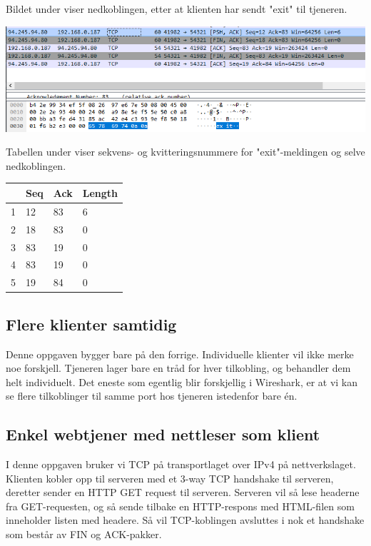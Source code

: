 \documentclass[12pt]{article}
\begin{document}
    Bildet under viser nedkoblingen, etter at klienten har sendt "exit" til tjeneren.

    \begin{center}
        \includegraphics[width=\linewidth]{assets/pYiH4NJ.png}
    \end{center}

    Tabellen under viser sekvens- og kvitteringsnummere for "exit"-meldingen og selve nedkoblingen.

    \begin{center}
        \begin{tabular}{|l|l|l|l|}
            \hline
              & Seq & Ack & Length \\ \hline
            1 & 12  & 83  & 6      \\ \hline
            2 & 18  & 83  & 0      \\ \hline
            3 & 83  & 19  & 0      \\ \hline
            4 & 83  & 19  & 0      \\ \hline
            5 & 19  & 84  & 0      \\ \hline
        \end{tabular}
    \end{center}

    \subsection{Flere klienter samtidig}
    Denne oppgaven bygger bare på den forrige. Individuelle klienter vil ikke merke noe forskjell.
    Tjeneren lager bare en tråd for hver tilkobling, og behandler dem helt individuelt. Det eneste 
    som egentlig blir forskjellig i Wireshark, er at vi kan se flere tilkoblinger til samme port 
    hos tjeneren istedenfor bare én.
    
    \subsection{Enkel webtjener med nettleser som klient}

    I denne oppgaven bruker vi TCP på transportlaget over IPv4 på nettverkslaget. Klienten kobler opp 
    til serveren med et 3-way TCP handshake til serveren, deretter sender en HTTP GET 
    request til serveren. Serveren vil så lese headerne fra GET-requesten, 
    og så sende tilbake en HTTP-respons med HTML-filen som inneholder listen med headere. Så vil 
    TCP-koblingen avsluttes i nok et handshake som består av FIN og ACK-pakker. 
\end{document}
